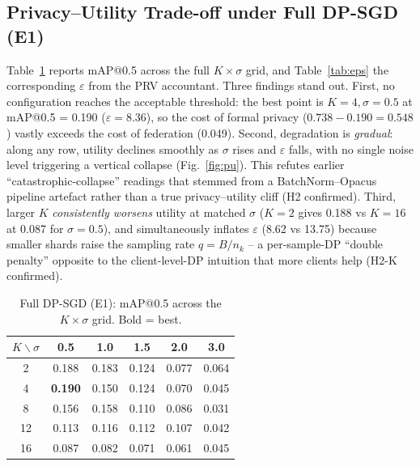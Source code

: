 \documentclass[twocolumn,a4paper,10pt]{article}
\begin{document}
\subsection{Privacy--Utility Trade-off under Full DP-SGD (E1)}
\label{sec:e1results}
Table~\ref{tab:e1} reports mAP@0.5 across the full $K\times\sigma$ grid, and
Table~\ref{tab:eps} the corresponding $\varepsilon$ from the PRV accountant.
Three findings stand out. First, no configuration reaches the acceptable
threshold: the best point is $K{=}4,\sigma{=}0.5$ at mAP@0.5 = 0.190
($\varepsilon = 8.36$), so the cost of formal privacy ($0.738 - 0.190 = 0.548$)
vastly exceeds the cost of federation (0.049). Second, degradation is
\emph{gradual}: along any row, utility declines smoothly as $\sigma$ rises and
$\varepsilon$ falls, with no single noise level triggering a vertical collapse
(Fig.~\ref{fig:pu}). This refutes earlier ``catastrophic-collapse'' readings
that stemmed from a BatchNorm--Opacus pipeline artefact rather than a true
privacy--utility cliff (H2 confirmed). Third, larger $K$ \emph{consistently
worsens} utility at matched $\sigma$ ($K{=}2$ gives 0.188 vs $K{=}16$ at 0.087
for $\sigma{=}0.5$), and simultaneously inflates $\varepsilon$ (8.62 vs 13.75)
because smaller shards raise the sampling rate $q = B/n_k$ -- a per-sample-DP
``double penalty'' opposite to the client-level-DP intuition that more clients
help (H2-K confirmed).

\begin{table}[ht]
\centering
\caption{Full DP-SGD (E1): mAP@0.5 across the $K\times\sigma$ grid. Bold = best.}
\label{tab:e1}
\small
\setlength{\tabcolsep}{4pt}
\begin{tabular}{cccccc}
\toprule
$K\backslash\sigma$ & 0.5 & 1.0 & 1.5 & 2.0 & 3.0 \\
\midrule
2  & 0.188 & 0.183 & 0.124 & 0.077 & 0.064 \\
4  & \textbf{0.190} & 0.150 & 0.124 & 0.070 & 0.045 \\
8  & 0.156 & 0.158 & 0.110 & 0.086 & 0.031 \\
12 & 0.113 & 0.116 & 0.112 & 0.107 & 0.042 \\
16 & 0.087 & 0.082 & 0.071 & 0.061 & 0.045 \\
\bottomrule
\end{tabular}
\end{table}
\end{document}
